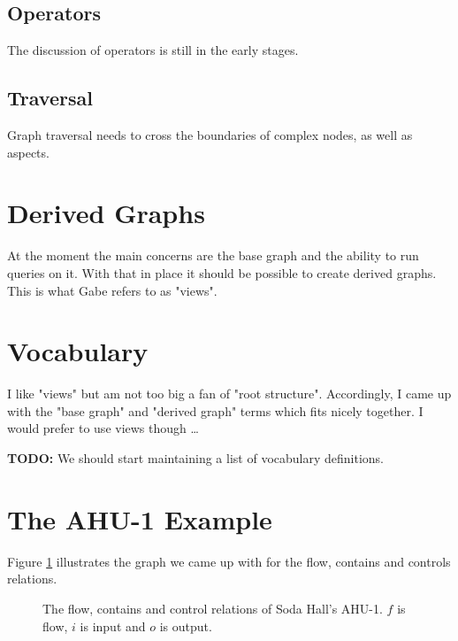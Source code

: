 \documentclass{article}
\newcommand{\includeSVG}[1]{
  \texttt{[image: ./figs/\#1.pdf]}
}
\begin{document}
\subsection{Operators}

The discussion of operators is still in the early stages.

\subsection{Traversal}

Graph traversal needs to cross the boundaries of complex nodes, as well as aspects.

\section{Derived Graphs}

At the moment the main concerns are the base graph and the ability to run queries on it. With that in place it should be possible to create derived graphs. This is what Gabe refers to as "views".

\section{Vocabulary}

I like "views" but am not too big a fan of "root structure". Accordingly, I came up with the "base graph" and "derived graph" terms which fits nicely together. I would prefer to use views though \ldots

\textbf{TODO:} We should start maintaining a list of vocabulary definitions.

\section{The AHU-1 Example}

Figure \ref{fig:ahu1} illustrates the graph we came up with for the flow, contains and controls relations.

\begin{figure}[tb]
  \begin{center}
    \scalebox{0.8}{\includeSVG{ahu1_from_writeboard}}
  \end{center}
  \caption{The flow, contains and control relations of Soda Hall's AHU-1. $f$ is flow, $i$ is input and $o$ is output.}
  \label{fig:ahu1}
\end{figure}
\end{document}
